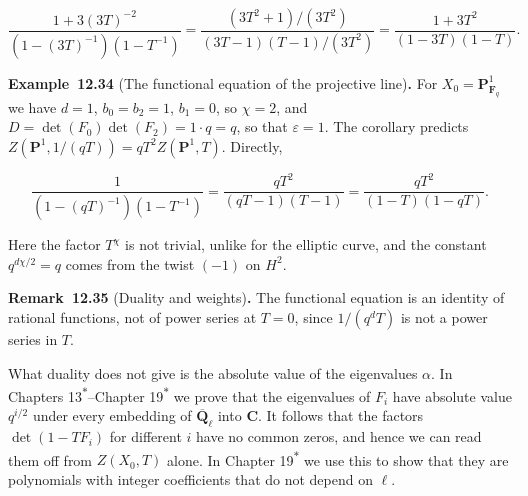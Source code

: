 \documentclass[11pt]{article}
\newenvironment{bpstatement}[2]{\par\addvspace{0.6\baselineskip}\noindent\textbf{#1}#2\textbf{.}\enspace\ignorespaces}
  {\par\addvspace{0.4\baselineskip}}
\newcommand{\bpout}[1]{#1\textsuperscript{\hyperlink{bp-outside}{\ensuremath{\ast}}}}
\begin{document}
\[
\frac{1+3(3T)^{-2}}{(1-(3T)^{-1})(1-T^{-1})}
=\frac{(3T^2+1)/(3T^2)}{(3T-1)(T-1)/(3T^2)}
=\frac{1+3T^2}{(1-3T)(1-T)}.
\]

\label{bp328}%
\begin{bpstatement}{Example~12.34}{ (The functional equation of the projective line)}
For \(X_0=\mathbf P^1_{\mathbf F_q}\) we have \(d=1\), \(b_0=b_2=1\), \(b_1=0\), so \(\chi=2\), and \(D=\det(F_0)\det(F_2)=1\cdot q=q\), so that \(\varepsilon=1\). The corollary predicts \(Z(\mathbf P^1,1/(qT))=qT^2Z(\mathbf P^1,T)\). Directly,

\[
\frac1{(1-(qT)^{-1})(1-T^{-1})}
=\frac{qT^2}{(qT-1)(T-1)}
=\frac{qT^2}{(1-T)(1-qT)}.
\]

Here the factor \(T^{\chi}\) is not trivial, unlike for the elliptic curve, and the constant \(q^{d\chi/2}=q\) comes from the twist \((-1)\) on \(H^2\).
\end{bpstatement}

\label{bp329}%
\begin{bpstatement}{Remark~12.35}{ (Duality and weights)}
The functional equation is an identity of rational functions, not of power series at \(T=0\), since \(1/(q^dT)\) is not a power series in \(T\).

What duality does not give is the absolute value of the eigenvalues \(\alpha\). In Chapters \bpout{13}–\bpout{Chapter 19} we prove that the eigenvalues of \(F_i\) have absolute value \(q^{i/2}\) under every embedding of \(\overline{\mathbf Q}_\ell\) into \(\mathbf C\). It follows that the factors \(\det(1-TF_i)\) for different \(i\) have no common zeros, and hence we can read them off from \(Z(X_0,T)\) alone. In Chapter \bpout{19} we use this to show that they are polynomials with integer coefficients that do not depend on \(\ell\).
\end{bpstatement}




\clearpage{}\hypertarget{bp-outside}{}%
\end{document}
